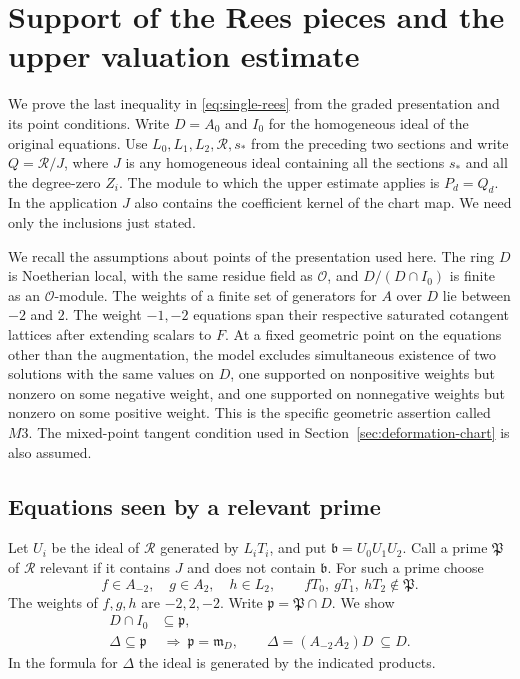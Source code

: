 \section{Support of the Rees pieces and the upper valuation estimate}
\label{sec:deformation-support}

We prove the last inequality in \eqref{eq:single-rees} from the
graded presentation and its point conditions. Write \(D=A_0\) and
\(I_0\) for the homogeneous ideal of the original equations. Use
\(L_0,L_1,L_2,\mathcal R,s_*\) from the preceding two sections and
write \(Q=\mathcal R/J\), where \(J\) is any homogeneous ideal
containing all the sections \(s_*\) and all the degree-zero \(Z_i\).
The module to which the upper estimate applies is \(P_d=Q_d\).
In the application \(J\) also contains the coefficient kernel of
the chart map. We need only the inclusions just stated.

We recall the assumptions about points of the presentation used here.
The ring \(D\) is Noetherian local, with the same residue field as
\(\mathcal O\), and \(D/(D\cap I_0)\) is finite as an
\(\mathcal O\)-module. The weights of a finite set of generators
for \(A\) over \(D\) lie between \(-2\) and \(2\). The weight
\(-1,-2\) equations span their respective saturated cotangent
lattices after extending scalars to \(F\). At a fixed geometric
point on the equations other than the augmentation, the model
excludes simultaneous existence of two solutions with the same
values on \(D\), one supported on nonpositive weights but nonzero
on some negative weight, and one supported on nonnegative weights
but nonzero on some positive weight. This is the specific geometric
assertion called \(M3\). The mixed-point tangent condition used in
Section~\ref{sec:deformation-chart} is also assumed.

\subsection{Equations seen by a relevant prime}

Let \(U_i\) be the ideal of \(\mathcal R\) generated by \(L_i T_i\),
and put \(\mathfrak b=U_0U_1U_2\). Call a prime \(\mathfrak P\)
of \(\mathcal R\) relevant if it contains \(J\) and does not contain
\(\mathfrak b\). For such a prime choose
\[
 f\in A_{-2},\quad g\in A_2,\quad h\in L_2,\qquad
 fT_0,\ gT_1,\ hT_2\notin\mathfrak P .
\]
The weights of \(f,g,h\) are \(-2,2,-2\). Write
\(\mathfrak p=\mathfrak P\cap D\). We show
\begin{align}
 D\cap I_0&\subseteq\mathfrak p, \label{eq:rees-contract}\\
 \Delta\subseteq\mathfrak p&\ \Longrightarrow\
         \mathfrak p=\mathfrak m_D,\qquad
 \Delta=(A_{-2}A_2)D\ \subseteq D . \label{eq:rees-boundary}
\end{align}
In the formula for \(\Delta\) the ideal is generated by the indicated
products.

